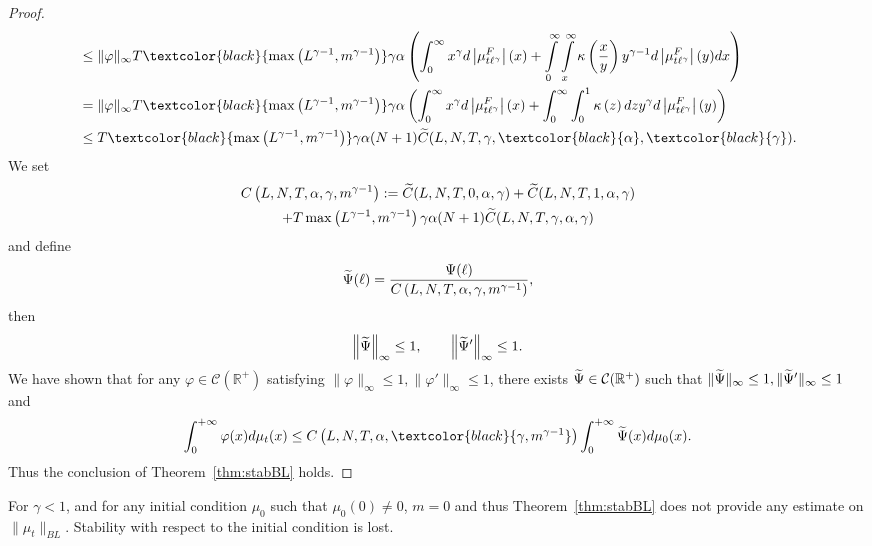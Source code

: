 \documentclass[AHL,Unicode,longabstracts,published]{cedram}
\newcommand*\dst{\displaystyle}
\newcommand*\R{\mathbb{R}}
\newcommand{\clC}{\mathcal{C}}
\newcommand{\comMD}[1]{\textcolor{black}{#1}}
\newcommand{\MT}[1]{\textcolor{black}{#1}}
\let\oldtilde\tilde
\renewcommand*{\tilde}[1]{\mathchoice{\widetilde{#1}}{\widetilde{#1}}{\oldtilde{#1}}{\oldtilde{#1}}}
\begin{document}
\begin{proof}
\begin{multline*}
\begin{aligned}
& \leq \|\varphi\|_{\infty} T\comMD{\max\left(L^{\gamma-1},m^{\gamma-1}\right)} \gamma \alpha \left(\int_0^{\infty} x^{\gamma} d \left|\mu_{t\ell^{\gamma}}^{F}\right|(x) + \int\limits_0^{\infty}
\int\limits_{x}^{\infty}\kappa\left(\dfrac{x}{y} \right) y^{\gamma-1} d \left|\mu_{t \ell^{\gamma}}^{F}\right| (y)dx \right)
\\
&=\|\varphi\|_{\infty} T\comMD{\max\left(L^{\gamma-1},m^{\gamma-1}\right)}\gamma \alpha\left(\dst\int_0^{\infty} x^{\gamma} d\left|\mu_{t\ell^{\gamma}}^{F}\right|(x) +\dst\int_0^{\infty}
\dst\int_{0}^{1}\kappa\left(z \right) dz y^{\gamma} d\left|\mu_{t \ell^{\gamma}}^{F}\right| (y)\right)\\
&\leq T\comMD{\max\left(L^{\gamma-1},m^{\gamma-1}\right)}\gamma \alpha (N+1) \tilde{C}(L,N,T,\gamma,\MT{\alpha},\MT{\gamma}).
\end{aligned}
\end{multline*}
We set 
\begin{multline*}
C\left(L,N,T,\alpha,\gamma,m^{\gamma-1}\right)
:=\tilde{C}(L,N,T,0,\alpha,\gamma)+\tilde{C}(L,N,T,1,\alpha,\gamma)\\
+ T\max\left(L^{\gamma-1},m^{\gamma-1}\right) \gamma \alpha (N+1) \tilde{C}(L,N,T,\gamma,\alpha,\gamma)
\end{multline*}
and define
\begin{equation*}
\tilde{\Psi} (\ell) = \dfrac{\Psi(\ell)}{C\left(L,N,T,\alpha,\gamma,m^{\gamma-1}\right)},
\end{equation*}
then
\begin{equation*}
\left\|\tilde{\Psi}\right\|_{\infty} \leq 1, \qquad \left\|\tilde{\Psi}'\right\|_{\infty} \leq 1.
\end{equation*}
We have shown that for any $\varphi \in \clC(\R^+)$ satisfying $\|\varphi\|_{\infty} \leq 1, \|\varphi'\|_{\infty} \leq 1$, there exists $\tilde{\Psi} \in \clC(\R^+)$ such that $\|\tilde{\Psi}\|_{\infty} \leq 1, \|\tilde{\Psi}'\|_{\infty} \leq 1$ and
\begin{equation*}
\dst\int_0^{+\infty} \varphi(x) d\mu_t(x) \leq C\left(L,N,T,\alpha,\MT{\gamma,m^{\gamma-1}}\right)\dst\int_0^{+\infty} \tilde{\Psi}(x) d\mu_0(x).
\end{equation*}
Thus the conclusion of Theorem~\ref{thm:stabBL} holds.
\end{proof}


\begin{rema}
For $\gamma<1$, and for any initial condition $\mu_0$ such that $\mu_0(0) \neq 0$, $m=0$ and thus Theorem~\ref{thm:stabBL} does not provide any estimate on $\|\mu_t\|_{BL}$. Stability with respect to the initial condition is lost.
\end{rema}
\end{document}
